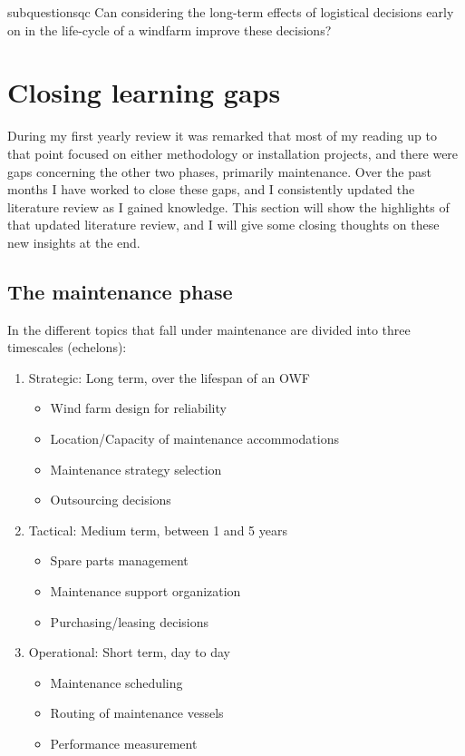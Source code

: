 \documentclass[a4paper,12pt]{article}
\begin{document}
\begin{restatable}{subquestion}{sqc}
\label{sqc}
Can considering the long-term effects of logistical decisions early on in the life-cycle of a windfarm improve these decisions? 
\end{restatable}

\pagebreak

\section{Closing learning gaps}\label{s:know}
During my first yearly review it was remarked that most of my reading up to that point focused on either methodology or installation projects, and there were gaps concerning the other two phases, primarily maintenance. Over the past months I have worked to close these gaps, and I consistently updated the literature review as I gained knowledge. This section will show the highlights of that updated literature review, and I will give some closing thoughts on these new insights at the end. 

\subsection{The maintenance phase} \label{ss:maint}
In \cite{shafiee2015maintenance} the different topics that fall under maintenance are divided into three timescales (echelons):

\begin{enumerate}
\item Strategic: Long term, over the lifespan of an OWF
\begin{itemize}
\item Wind farm design for reliability
\item Location/Capacity of maintenance accommodations
\item Maintenance strategy selection
\item Outsourcing decisions
\end{itemize}
\item Tactical: Medium term, between 1 and 5 years
\begin{itemize}
\item Spare parts management
\item Maintenance support organization
\item Purchasing/leasing decisions
\end{itemize}
\item Operational: Short term, day to day
\begin{itemize}
\item Maintenance scheduling
\item Routing of maintenance vessels
\item Performance measurement
\end{itemize}
\end{enumerate}
\end{document}
